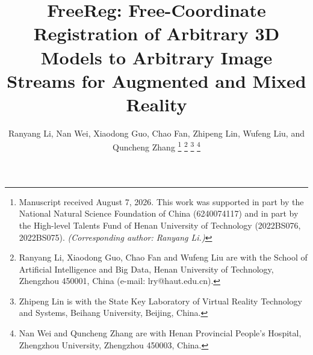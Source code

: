 \documentclass[9pt,twoside,web]{ieeecolor2}
\begin{document}
\title{FreeReg: Free-Coordinate Registration of Arbitrary 3D Models to Arbitrary Image Streams for Augmented and Mixed Reality}

\author{Ranyang Li, Nan Wei, Xiaodong Guo, Chao Fan, Zhipeng Lin, Wufeng Liu, and Quncheng Zhang
\thanks{Manuscript received August 7, 2026. This work was supported in part by the National Natural Science Foundation of China (6240074117) and in part by the High-level Talents Fund of Henan University of Technology (2022BS076, 2022BS075). \emph{(Corresponding author: Ranyang Li.)}}
\thanks{Ranyang Li, Xiaodong Guo, Chao Fan and Wufeng Liu are with the School of Artificial Intelligence and Big Data, Henan University of Technology, Zhengzhou 450001, China (e-mail: lry@haut.edu.cn).}
\thanks{Zhipeng Lin is with the State Key Laboratory of Virtual Reality Technology and Systems, Beihang University, Beijing, China.}
\thanks{Nan Wei and Quncheng Zhang are with Henan Provincial People's Hospital, Zhengzhou University, Zhengzhou 450003, China.}
}

\maketitle
\end{document}
